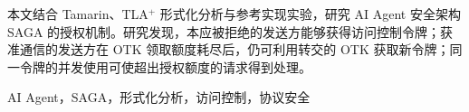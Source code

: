 \documentclass[letter]{ieice}
\begin{document}
\pagestyle{plain}
\raggedbottom
\begin{summary}
本文结合 Tamarin、TLA$^{+}$ 形式化分析与参考实现实验，研究 AI Agent 安全架构 SAGA 的授权机制。研究发现，本应被拒绝的发送方能够获得访问控制令牌；获准通信的发送方在 OTK 领取额度耗尽后，仍可利用转交的 OTK 获取新令牌；同一令牌的并发使用可使超出授权额度的请求得到处理。
\end{summary}
\begin{keywords}
AI Agent，SAGA，形式化分析，访问控制，协议安全
\end{keywords}









\end{document}
